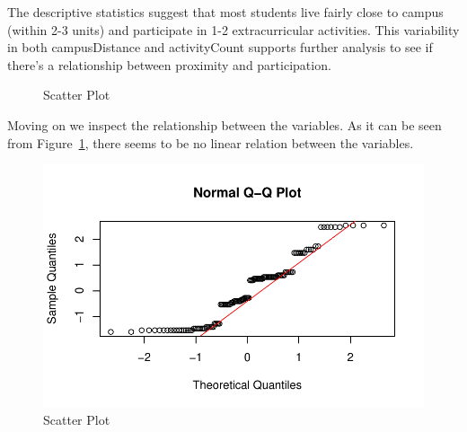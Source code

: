 \documentclass[
  letterpaper,
  DIV=11,
  numbers=noendperiod]{scrartcl}
\begin{document}
The descriptive statistics suggest that most students live fairly close
to campus (within 2-3 units) and participate in 1-2 extracurricular
activities. This variability in both campusDistance and activityCount
supports further analysis to see if there's a relationship between
proximity and participation.

\begin{figure}


\caption{\label{fig-plot1}Scatter Plot}

\end{figure}%

Moving on we inspect the relationship between the variables. As it can
be seen from Figure~\ref{fig-plot1}, there seems to be no linear
relation between the variables.

\begin{figure}[H]

{\centering \includegraphics{technical_report_files/figure-pdf/plot2-1.pdf}

}

\caption{Scatter Plot}

\end{figure}%
\end{document}
